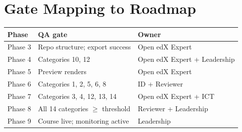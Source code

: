 \section{Gate Mapping to Roadmap}

\begin{table}[h]
\centering
\begin{tabular}{@{}lll@{}}
\toprule
\textbf{Phase} & \textbf{QA gate} & \textbf{Owner} \\
\midrule
Phase 3 & Repo structure; export success & Open edX Expert \\
Phase 4 & Categories 10, 12 & Open edX Expert + Leadership \\
Phase 5 & Preview renders & Open edX Expert \\
Phase 6 & Categories 1, 2, 5, 6, 8 & ID + Reviewer \\
Phase 7 & Categories 3, 4, 12, 13, 14 & Open edX Expert + ICT \\
Phase 8 & All 14 categories $\geq$ threshold & Reviewer + Leadership \\
Phase 9 & Course live; monitoring active & Leadership \\
\bottomrule
\end{tabular}
\end{table}